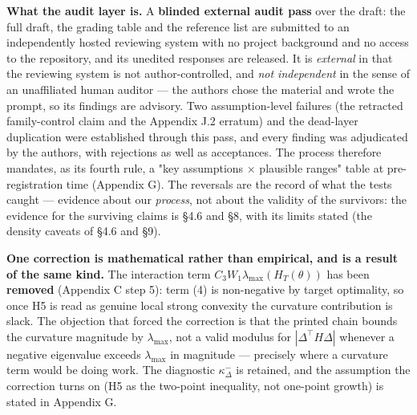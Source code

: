 \documentclass[pdflatex,sn-mathphys-ay]{sn-jnl}
\begin{document}
\textbf{What the audit layer is.} A \textbf{blinded external audit pass} over the draft: the full draft, the grading table and the reference list are submitted to an independently hosted reviewing system with no project background and no access to the repository, and its unedited responses are released. It is \emph{external} in that the reviewing system is not author-controlled, and \emph{not independent} in the sense of an unaffiliated human auditor --- the authors chose the material and wrote the prompt, so its findings are advisory. Two assumption-level failures (the retracted family-control claim and the Appendix J.2 erratum) and the dead-layer duplication were established through this pass, and every finding was adjudicated by the authors, with rejections as well as acceptances. The process therefore mandates, as its fourth rule, a "key assumptions \ensuremath{\times} plausible ranges" table at pre-registration time (Appendix G). The reversals are the record of what the tests caught --- evidence about our \emph{process}, not about the validity of the survivors: the evidence for the surviving claims is \S{}4.6 and \S{}8, with its limits stated (the density caveats of \S{}4.6 and \S{}9).

\textbf{One correction is mathematical rather than empirical, and is a result of the same kind.} The interaction term $C_3W_1\lambda_{\max}(H_T(\theta))$ has been \textbf{removed} (Appendix C step 5): term (4) is non-negative by target optimality, so once H5 is read as genuine local strong convexity the curvature contribution is slack. The objection that forced the correction is that the printed chain bounds the curvature magnitude by $\lambda_{\max}$, not a valid modulus for $|\Delta^\top H\Delta|$ whenever a negative eigenvalue exceeds $\lambda_{\max}$ in magnitude --- precisely where a curvature term would be doing work. The diagnostic $\kappa^-_\Delta$ is retained, and the assumption the correction turns on (H5 as the two-point inequality, not one-point growth) is stated in Appendix G.
\end{document}
